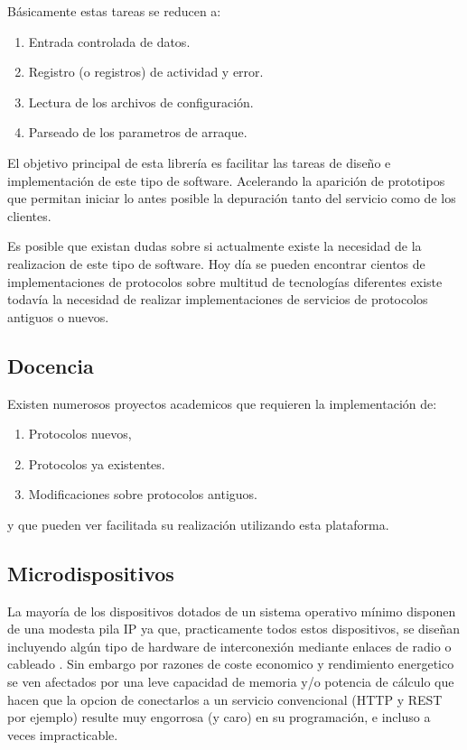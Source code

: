 \documentclass[a4paper,spanish,12pt]{book}
\begin{document}
Básicamente estas tareas se reducen a:
\begin{enumerate}
	\item Entrada controlada de datos.
	\item Registro (o registros) de actividad y error.
	\item Lectura de los archivos de configuraci\'on.
	\item Parseado de los parametros de arraque.
\end{enumerate}

El objetivo principal de esta librería es facilitar las tareas de diseño e implementación de este tipo de software. Acelerando la aparición de prototipos que permitan iniciar lo antes posible la depuración tanto del servicio como de los clientes.

Es posible que existan dudas sobre si actualmente existe la necesidad de la realizacion de este tipo de software. Hoy día se pueden encontrar cientos de implementaciones de protocolos sobre multitud de tecnologías diferentes existe todavía la necesidad de realizar implementaciones de servicios de protocolos antiguos o nuevos.

\subsection{Docencia}
Existen numerosos proyectos academicos que requieren la implementaci\'on de:
\begin{enumerate}
	\item Protocolos nuevos,
	\item Protocolos ya existentes.
	\item Modificaciones sobre protocolos antiguos. 
\end{enumerate}

y que pueden ver facilitada su realización utilizando esta plataforma.

\subsection{Microdispositivos}
La mayor\'ia de los dispositivos dotados de un sistema operativo m\'inimo disponen de una modesta pila IP ya que, practicamente todos estos dispositivos, se dise\~{n}an incluyendo algún tipo de hardware de interconexi\'on mediante enlaces de radio o cableado . Sin embargo por razones de coste economico y rendimiento energetico se ven afectados por una leve capacidad de memoria y/o potencia de c\'alculo que hacen que la opcion de conectarlos a un servicio convencional (HTTP y REST por ejemplo) resulte muy engorrosa (y caro) en su programaci\'on, e incluso a veces impracticable.
\end{document}
